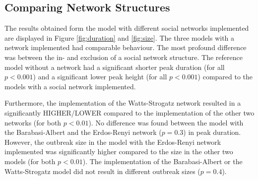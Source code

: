 \documentclass[10pt]{article}
\begin{document}
    \subsection{Comparing Network Structures}
    The results obtained form the model with different social networks implemented are displayed in Figure \ref{fig:duration} and \ref{fig:size}. The three models with a network implemented had comparable behaviour. The most profound difference was between the in- and exclusion of a social network structure. The reference model without a network had a significant shorter peak duration (for all $ p < 0.001$) and a significant lower peak height (for all $ p < 0.001$) compared to the models with a social network implemented.

    Furthermore, the implementation of the Watts-Strogatz network resulted in a significantly HIGHER/LOWER compared to the implementation of the other two networks (for both $p<0.01$). No difference was found between the model with the Barabasi-Albert and the Erdos-Renyi network ($p = 0.3$) in peak duration. However, the outbreak size in the model with the Erdos-Renyi network implemented was significantly higher compared to the size in the other two models (for both $p<0.01$). The implementation of the Barabasi-Albert or the Watts-Strogatz model did not result in different outbreak sizes ($p = 0.4$).

\end{document}
